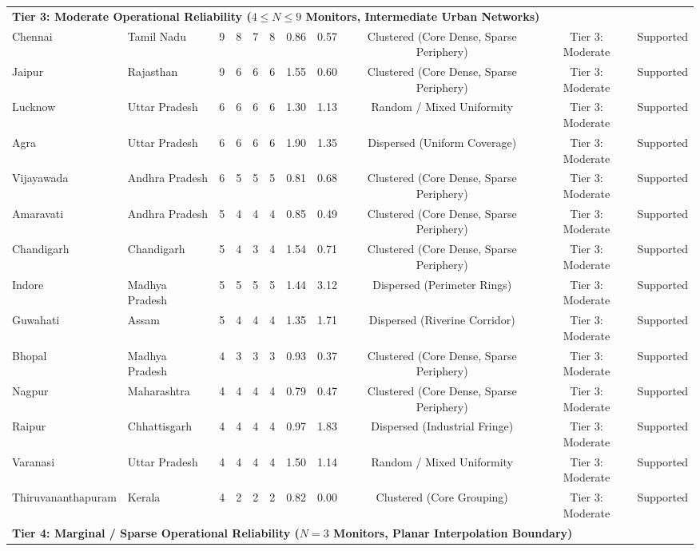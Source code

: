 \begin{table}[t]
\begin{tabular}{llccccccccl}
\midrule
\multicolumn{11}{l}{\textbf{Tier 3: Moderate Operational Reliability ($4 \le N \le 9$ Monitors, Intermediate Urban Networks)}} \\
Chennai & Tamil Nadu & 9 & 8 & 7 & 8 & 0.86 & 0.57 & Clustered (Core Dense, Sparse Periphery) & Tier 3: Moderate & Supported \\
Jaipur & Rajasthan & 9 & 6 & 6 & 6 & 1.55 & 0.60 & Clustered (Core Dense, Sparse Periphery) & Tier 3: Moderate & Supported \\
Lucknow & Uttar Pradesh & 6 & 6 & 6 & 6 & 1.30 & 1.13 & Random / Mixed Uniformity & Tier 3: Moderate & Supported \\
Agra & Uttar Pradesh & 6 & 6 & 6 & 6 & 1.90 & 1.35 & Dispersed (Uniform Coverage) & Tier 3: Moderate & Supported \\
Vijayawada & Andhra Pradesh & 6 & 5 & 5 & 5 & 0.81 & 0.68 & Clustered (Core Dense, Sparse Periphery) & Tier 3: Moderate & Supported \\
Amaravati & Andhra Pradesh & 5 & 4 & 4 & 4 & 0.85 & 0.49 & Clustered (Core Dense, Sparse Periphery) & Tier 3: Moderate & Supported \\
Chandigarh & Chandigarh & 5 & 4 & 3 & 4 & 1.54 & 0.71 & Clustered (Core Dense, Sparse Periphery) & Tier 3: Moderate & Supported \\
Indore & Madhya Pradesh & 5 & 5 & 5 & 5 & 1.44 & 3.12 & Dispersed (Perimeter Rings) & Tier 3: Moderate & Supported \\
Guwahati & Assam & 5 & 4 & 4 & 4 & 1.35 & 1.71 & Dispersed (Riverine Corridor) & Tier 3: Moderate & Supported \\
Bhopal & Madhya Pradesh & 4 & 3 & 3 & 3 & 0.93 & 0.37 & Clustered (Core Dense, Sparse Periphery) & Tier 3: Moderate & Supported \\
Nagpur & Maharashtra & 4 & 4 & 4 & 4 & 0.79 & 0.47 & Clustered (Core Dense, Sparse Periphery) & Tier 3: Moderate & Supported \\
Raipur & Chhattisgarh & 4 & 4 & 4 & 4 & 0.97 & 1.83 & Dispersed (Industrial Fringe) & Tier 3: Moderate & Supported \\
Varanasi & Uttar Pradesh & 4 & 4 & 4 & 4 & 1.50 & 1.14 & Random / Mixed Uniformity & Tier 3: Moderate & Supported \\
Thiruvananthapuram & Kerala & 4 & 2 & 2 & 2 & 0.82 & 0.00 & Clustered (Core Grouping) & Tier 3: Moderate & Supported \\
\midrule
\multicolumn{11}{l}{\textbf{Tier 4: Marginal / Sparse Operational Reliability ($N = 3$ Monitors, Planar Interpolation Boundary)}} \\

\end{tabular}
\end{table}

